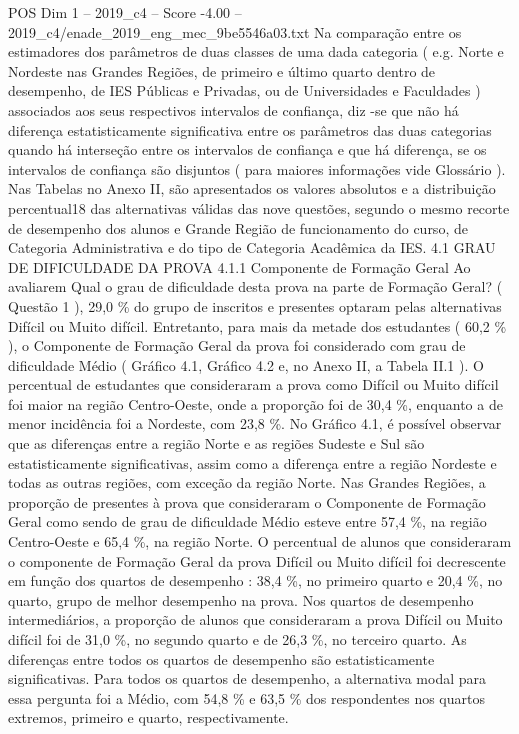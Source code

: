 \begin{textsample}{POS Dim 1 – 2019\_c4 – Score -4.00 – 2019\_c4/enade\_2019\_eng\_mec\_9be5546a03.txt}
Na comparação entre os estimadores dos parâmetros de duas classes de uma dada categoria ( e.g.
Norte e Nordeste nas Grandes Regiões, de primeiro e último quarto dentro de desempenho, de IES Públicas e Privadas, ou de Universidades e Faculdades ) associados aos seus respectivos intervalos de confiança, diz -se que não há diferença estatisticamente significativa entre os parâmetros das duas categorias quando há interseção entre os intervalos de confiança e que há diferença, se os intervalos de confiança são disjuntos ( para maiores informações vide Glossário ).
Nas Tabelas no Anexo II, são apresentados os valores absolutos e a distribuição percentual18 das alternativas válidas das nove questões, segundo o mesmo recorte de desempenho dos alunos e Grande Região de funcionamento do curso, de Categoria Administrativa e do tipo de Categoria Acadêmica da IES. 4.1 GRAU DE DIFICULDADE DA PROVA 4.1.1 Componente de Formação Geral Ao avaliarem Qual o grau de dificuldade desta prova na parte de Formação Geral? ( Questão 1 ), 29,0 \% do grupo de inscritos e presentes optaram pelas alternativas Difícil ou Muito difícil.
Entretanto, para mais da metade dos estudantes ( 60,2 \% ), o Componente de Formação Geral da prova foi considerado com grau de dificuldade Médio ( Gráfico 4.1, Gráfico 4.2 e, no Anexo II, a Tabela II.1 ).
O percentual de estudantes que consideraram a prova como Difícil ou Muito difícil foi maior na região Centro-Oeste, onde a proporção foi de 30,4 \%, enquanto a de menor incidência foi a Nordeste, com 23,8 \%.
No Gráfico 4.1, é possível observar que as diferenças entre a região Norte e as regiões Sudeste e Sul são estatisticamente significativas, assim como a diferença entre a região Nordeste e todas as outras regiões, com exceção da região Norte.
Nas Grandes Regiões, a proporção de presentes à prova que consideraram o Componente de Formação Geral como sendo de grau de dificuldade Médio esteve entre 57,4 \%, na região Centro-Oeste e 65,4 \%, na região Norte.
O percentual de alunos que consideraram o componente de Formação Geral da prova Difícil ou Muito difícil foi decrescente em função dos quartos de desempenho : 38,4 \%, no primeiro quarto e 20,4 \%, no quarto, grupo de melhor desempenho na prova.
Nos quartos de desempenho intermediários, a proporção de alunos que consideraram a prova Difícil ou Muito difícil foi de 31,0 \%, no segundo quarto e de 26,3 \%, no terceiro quarto.
As diferenças entre todos os quartos de desempenho são estatisticamente significativas.
Para todos os quartos de desempenho, a alternativa modal para essa pergunta foi a Médio, com 54,8 \% e 63,5 \% dos respondentes nos quartos extremos, primeiro e quarto, respectivamente.

\end{textsample}
